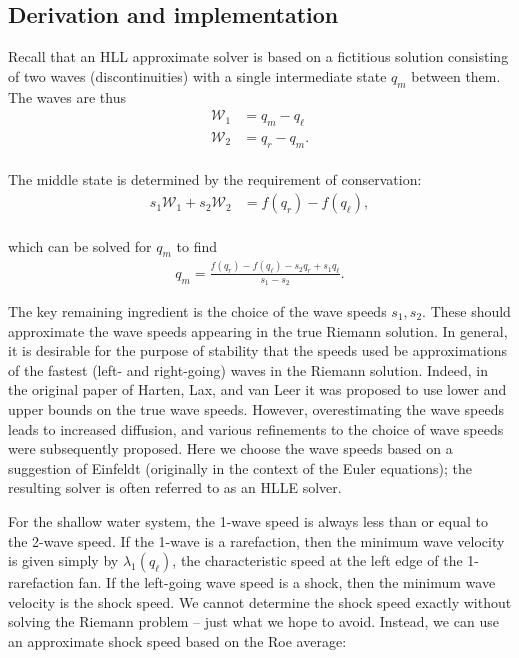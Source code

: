 \documentclass{SIAMbook2016}
\begin{document}
\hypertarget{derivation-and-implementation}{%
\subsection{Derivation and
implementation}\label{derivation-and-implementation}}

Recall that an HLL approximate solver is based on a fictitious solution
consisting of two waves (discontinuities) with a single intermediate
state \(q_m\) between them. The waves are thus\\
\begin{align}
{\mathcal W}_1 & = q_m - q_\ell \\
{\mathcal W}_2 & = q_r - q_m.
\end{align}\\
The middle state is determined by the requirement of conservation:\\
\begin{align}
s_1 {\mathcal W}_1 + s_2 {\mathcal W}_2 & = f(q_r) - f(q_\ell),
\end{align}\\
which can be solved for \(q_m\) to find\\
\begin{align}  \label{SWA:hll_middle_state}
q_m = \frac{f(q_r) - f(q_\ell) - s_2 q_r + s_1 q_\ell}{s_1 - s_2}.
\end{align}

The key remaining ingredient is the choice of the wave speeds
\(s_1, s_2\). These should approximate the wave speeds appearing in the
true Riemann solution. In general, it is desirable for the purpose of
stability that the speeds used be approximations of the fastest (left-
and right-going) waves in the Riemann solution. Indeed, in the original
paper of Harten, Lax, and van Leer \cite{HLL} it was proposed to use
lower and upper bounds on the true wave speeds. However, overestimating
the wave speeds leads to increased diffusion, and various refinements to
the choice of wave speeds were subsequently proposed. Here we choose the
wave speeds based on a suggestion of Einfeldt (originally in the context
of the Euler equations); the resulting solver is often referred to as an
HLLE solver.

For the shallow water system, the 1-wave speed is always less than or
equal to the 2-wave speed. If the 1-wave is a rarefaction, then the
minimum wave velocity is given simply by \(\lambda_1(q_\ell)\), the
characteristic speed at the left edge of the 1-rarefaction fan. If the
left-going wave speed is a shock, then the minimum wave velocity is the
shock speed. We cannot determine the shock speed exactly without solving
the Riemann problem -- just what we hope to avoid. Instead, we can use
an approximate shock speed based on the Roe average:
\end{document}
